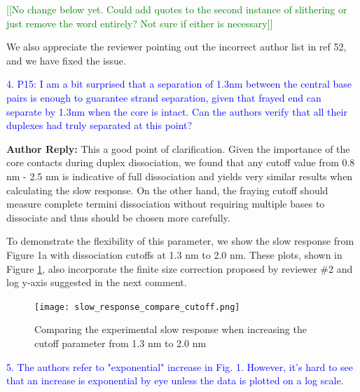 \documentclass[11pt,a4paper]{letter} %
\newcommand*{\rood}[1]{{\color{red}{#1}}}
\newcommand*{\noteg}[1]{\textcolor{green}{[[#1]]}}		%
\begin{document}
\noteg{No change below yet. Could add quotes to the second instance of slithering or just remove the word entirely? Not sure if either is necessary}

\rood{``Out-of-register states for 5$^\prime$-GCGCGC-3$^\prime$ hexamers were identified as deep kinetic traps along the hybridization pathway and ``slithering'' through these states did not provide a significant hybridization pathway compared to an alternative ``zippering'' mechanism. (In contrast, out-of-register slithering and in-register zippering served as two parallel pathways for hybridization of 5$^\prime$-GGGGGG-3$^\prime$.)'' }

We also appreciate the reviewer pointing out the incorrect author list in ref 52, and we have fixed the issue.

\textcolor{blue}{4. P15: I am a bit surprised that a separation of 1.3nm between the central base pairs is enough to guarantee strand separation, given that frayed end can separate by 1.3nm when the core is intact. Can the authors verify that all their duplexes had truly separated at this point?}

\textbf{Author Reply:}   This a good point of clarification. Given the importance of the core contacts during duplex dissociation, we found that any cutoff value from 0.8 nm - 2.5 nm is indicative of full dissociation and yields very similar results when calculating the slow response. On the other hand, the fraying cutoff should measure complete termini dissociation without requiring multiple bases to dissociate and thus should be chosen more carefully. 

To demonstrate the flexibility of this parameter, we show the slow response from Figure 1a with dissociation cutoffs at 1.3 nm to 2.0 nm. These plots, shown in Figure \ref{fig:compare_cutoffs}, also incorporate the finite size correction proposed by reviewer \#2 and log y-axis suggested in the next comment.

\begin{figure}[ht!]
	\begin{center}
        \texttt{[image: slow\_response\_compare\_cutoff.png]}
        \caption{Comparing the experimental slow response when increasing the cutoff parameter from 1.3 nm to 2.0 nm}
        \label{fig:compare_cutoffs}
	\end{center}
\end{figure}

\textcolor{blue}{5. The authors refer to "exponential" increase in Fig. 1. However, it's hard to see that an increase is exponential by eye unless the data is plotted on a log scale.}
\end{document}
